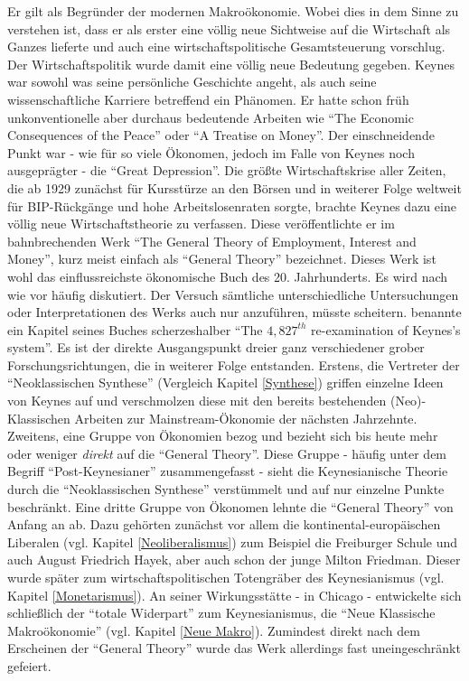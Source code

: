 Er gilt als Begründer der modernen Makroökonomie. Wobei dies in dem Sinne zu verstehen ist, dass er als erster eine völlig neue Sichtweise auf die Wirtschaft als Ganzes lieferte und auch eine wirtschaftspolitische Gesamtsteuerung vorschlug. Der Wirtschaftspolitik wurde damit eine völlig neue Bedeutung gegeben.
Keynes war sowohl was seine persönliche Geschichte angeht, als auch seine wissenschaftliche Karriere betreffend ein Phänomen. Er hatte schon früh unkonventionelle aber durchaus bedeutende Arbeiten wie \textcite{Keynes1919} "`The Economic Consequences of the Peace"' oder \textcite{Keynes1930} "`A Treatise on Money"'. Der einschneidende Punkt war - wie für so viele Ökonomen, jedoch im Falle von Keynes noch ausgeprägter - die "`Great Depression"'. Die größte Wirtschaftskrise aller Zeiten,  die ab 1929 zunächst für Kursstürze an den Börsen und in weiterer Folge weltweit für BIP-Rückgänge und hohe Arbeitslosenraten sorgte, brachte Keynes dazu eine völlig neue Wirtschaftstheorie zu verfassen. Diese veröffentlichte er im bahnbrechenden Werk \textcite{Keynes1936} "`The General Theory of Employment, Interest and Money"', kurz meist einfach als "`General Theory"' bezeichnet.
Dieses Werk ist wohl das einflussreichste ökonomische Buch des 20. Jahrhunderts. Es wird nach wie vor häufig diskutiert. Der Versuch sämtliche unterschiedliche Untersuchungen oder Interpretationen des Werks auch nur anzuführen, müsste scheitern. \textcite[S. 38ff]{Weintraub1979} benannte ein Kapitel seines Buches scherzeshalber "`The $4,827^{th}$ re-examination of Keynes's system"'. Es ist der direkte Ausgangspunkt dreier ganz verschiedener grober Forschungsrichtungen, die in weiterer Folge entstanden. Erstens, die Vertreter der "`Neoklassischen Synthese"' (Vergleich Kapitel \ref{Synthese}) griffen einzelne Ideen von Keynes auf und verschmolzen diese mit den bereits bestehenden (Neo)-Klassischen Arbeiten zur Mainstream-Ökonomie der nächsten Jahrzehnte. Zweitens, eine Gruppe von Ökonomien bezog und bezieht sich bis heute mehr oder weniger \textit{direkt} auf die "`General Theory"'. Diese Gruppe - häufig unter dem Begriff "`Post-Keynesianer"' zusammengefasst - sieht die Keynesianische Theorie durch die "`Neoklassischen Synthese"' verstümmelt und auf nur einzelne Punkte beschränkt. Eine dritte Gruppe von Ökonomen lehnte die "`General Theory"' von Anfang an ab. Dazu gehörten zunächst vor allem die kontinental-europäischen Liberalen (vgl. Kapitel \ref{Neoliberalismus}) zum Beispiel die Freiburger Schule und auch August Friedrich Hayek, aber auch schon der junge Milton Friedman. Dieser wurde später zum wirtschaftspolitischen Totengräber des Keynesianismus (vgl. Kapitel \ref{Monetarismus}). An seiner Wirkungsstätte - in Chicago - entwickelte sich schließlich der "`totale Widerpart"' zum Keynesianismus, die "`Neue Klassische Makroökonomie"' (vgl. Kapitel \ref{Neue Makro}). Zumindest direkt nach dem Erscheinen der "`General Theory"' wurde das Werk allerdings fast uneingeschränkt gefeiert. 

